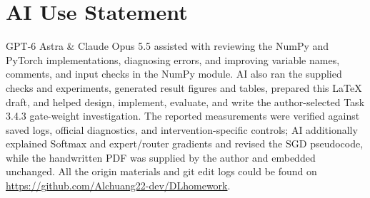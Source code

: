 \section*{AI Use Statement}
GPT-6 Astra \& Claude Opus 5.5 assisted with reviewing the NumPy and PyTorch implementations, diagnosing errors, and improving variable names, comments, and input checks in the NumPy module.
AI also ran the supplied checks and experiments, generated result figures and tables, prepared this LaTeX draft, and helped design, implement, evaluate, and write the author-selected Task 3.4.3 gate-weight investigation.
The reported measurements were verified against saved logs, official diagnostics, and intervention-specific controls; AI additionally explained Softmax and expert/router gradients and revised the SGD pseudocode, while the handwritten PDF was supplied by the author and embedded unchanged.
All the origin materials and git edit logs could be found on \url{https://github.com/Alchuang22-dev/DLhomework}.
